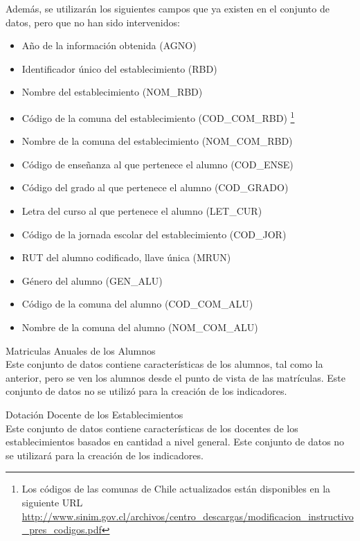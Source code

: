 \begin{longdescription}
        Además, se utilizarán los siguientes campos que ya existen en el conjunto de datos, pero que no han sido intervenidos:
            \begin{itemize}
              \item Año de la información obtenida (AGNO)
              \item Identificador único del establecimiento (RBD)
              \item Nombre del establecimiento (NOM\_RBD)
              \item Código de la comuna del establecimiento (COD\_COM\_RBD)
              \footnote{Los códigos de las comunas de Chile actualizados están disponibles en la siguiente URL \url{http://www.sinim.gov.cl/archivos/centro_descargas/modificacion_instructivo_pres_codigos.pdf}}
              \item Nombre de la comuna del establecimiento (NOM\_COM\_RBD)
              \item Código de enseñanza al que pertenece el alumno (COD\_ENSE)
              \item Código del grado al que pertenece el alumno (COD\_GRADO)
              \item Letra del curso al que pertenece el alumno (LET\_CUR)
              \item Código de la jornada escolar del establecimiento (COD\_JOR)
              \item RUT del alumno codificado, llave única (MRUN)
              \item Género del alumno (GEN\_ALU)
              \item Código de la comuna del alumno (COD\_COM\_ALU)
              \item Nombre de la comuna del alumno (NOM\_COM\_ALU)
            \end{itemize}
        \item[Matriculas Anuales de los Alumnos] \hfill \\
        Este conjunto de datos contiene características de los alumnos, tal como la anterior, pero se ven los alumnos desde el punto de vista de las matrículas.
        Este conjunto de datos no se utilizó para la creación de los indicadores.
        
        \item[Dotación Docente de los Establecimientos] \hfill \\
        Este conjunto de datos contiene características de los docentes de los establecimientos basados en cantidad a nivel general. Este conjunto de datos no se utilizará para la creación de los indicadores.
        

\end{longdescription}
